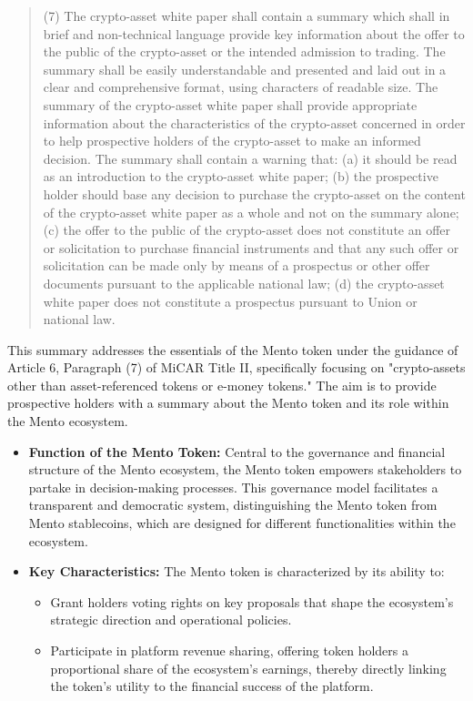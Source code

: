 \documentclass[a4paper]{article}
\theoremstyle{definition}
\begin{document}
\begin{appendices}
\begin{quote}
    (7) The crypto-asset white paper shall contain a summary which shall in brief and non-technical language provide key information about the offer to the public of the crypto-asset or the intended admission to trading. The summary shall be easily understandable and presented and laid out in a clear and comprehensive format, using characters of readable size. The summary of the crypto-asset white paper shall provide appropriate information about the characteristics of the crypto-asset concerned in order to help prospective holders of the crypto-asset to make an informed decision. The summary shall contain a warning that: (a) it should be read as an introduction to the crypto-asset white paper; (b) the prospective holder should base any decision to purchase the crypto-asset on the content of the crypto-asset white paper as a whole and not on the summary alone; (c) the offer to the public of the crypto-asset does not constitute an offer or solicitation to purchase financial instruments and that any such offer or solicitation can be made only by means of a prospectus or other offer documents pursuant to the applicable national law; (d) the crypto-asset white paper does not constitute a prospectus pursuant to Union or national law.
\end{quote}

This summary addresses the essentials of the Mento token under the guidance of Article 6, Paragraph (7) of MiCAR Title II, specifically focusing on "crypto-assets other than asset-referenced tokens or e-money tokens." The aim is to provide prospective holders with a summary about the Mento token and its role within the Mento ecosystem.

\begin{itemize}
    \item \textbf{Function of the Mento Token:}
    Central to the governance and financial structure of the Mento ecosystem, the Mento token empowers stakeholders to partake in decision-making processes. This governance model facilitates a transparent and democratic system, distinguishing the Mento token from Mento stablecoins, which are designed for different functionalities within the ecosystem.

    \item \textbf{Key Characteristics:}
    The Mento token is characterized by its ability to:
    \begin{itemize}
        \item Grant holders voting rights on key proposals that shape the ecosystem's strategic direction and operational policies.
        \item Participate in platform revenue sharing, offering token holders a proportional share of the ecosystem's earnings, thereby directly linking the token's utility to the financial success of the platform.
    \end{itemize}


\end{itemize}
\end{appendices}
\end{document}

